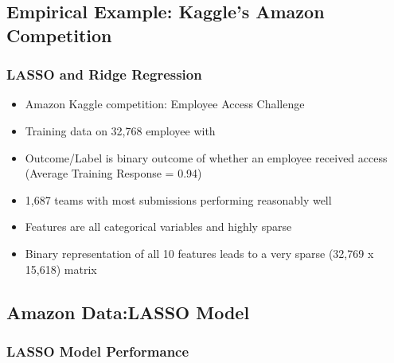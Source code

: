 \documentclass[]{beamer}
\begin{document}
\subsection{Empirical Example: Kaggle's Amazon Competition}
\begin{frame}
\frametitle{LASSO and Ridge Regression}
\begin{itemize}
\item<1-> Amazon Kaggle competition: Employee Access Challenge
\item<2-> Training data on 32,768 employee with 
\item<3-> Outcome/Label is binary outcome of whether an employee received access (Average Training Response = 0.94)
\item<4-> 1,687 teams with most submissions performing reasonably well 
\item<5-> Features are all categorical variables and highly sparse
\item<6-> Binary representation of all 10 features leads to a very sparse (32,769 x 15,618) matrix
\end{itemize}
\end{frame}

\subsection{Amazon Data:LASSO Model}
\begin{frame}
\frametitle{LASSO Model Performance}
\end{frame}
\end{document}
